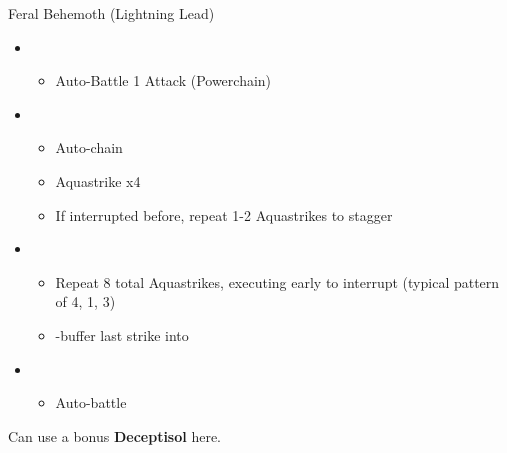 	\begin{battle}[0:33]{Feral Behemoth (Lightning Lead)}
		\begin{itemize}
			\item \first
			      \begin{itemize}
				      \item Auto-Battle 1 Attack (Powerchain)
			      \end{itemize}
			\item \fourth
			      \begin{itemize}
				      \item Auto-chain
				      \item Aquastrike x4
				      \item If interrupted before, repeat 1-2 Aquastrikes to stagger
			      \end{itemize}
			\item \fifth
			      \begin{itemize}
				      \item Repeat 8 total Aquastrikes, executing early to interrupt (typical pattern of 4, 1, 3)
				      \item \com-buffer last strike into
			      \end{itemize}
			\item \sixth
			      \begin{itemize}
				      \item Auto-battle
			      \end{itemize}
		\end{itemize}
	\end{battle}

	  Can use a bonus \textbf{Deceptisol} here.

